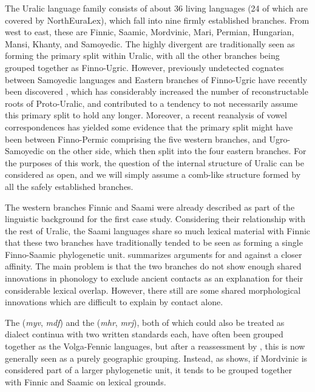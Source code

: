 The Uralic language family consists of about 36 living languages (24 of which are covered by NorthEuraLex), which fall into nine firmly established branches. From west to east, these are Finnic, Saamic, Mordvinic, Mari, Permian, Hungarian, Mansi, Khanty, and Samoyedic. The highly divergent  are traditionally seen as forming the primary split within Uralic, with all the other branches being grouped together as Finno-Ugric. However, previously undetected cognates between Samoyedic languages and Eastern branches of Finno-Ugric have recently been discovered \citep{aikio2002,aikio2006etym}, which has considerably increased the number of reconstructable roots of Proto-Uralic, and contributed to a tendency to not necessarily assume this primary split to hold any longer. Moreover, a recent reanalysis of vowel correspondences \citep{hakkinen2007} has yielded some evidence that the primary split might have been between Finno-Permic comprising the five western branches, and Ugro-Samoyedic on the other side, which then split into the four eastern branches. For the purposes of this work, the question of the internal structure of Uralic can be considered as open, and we will simply assume a comb-like structure formed by all the safely established branches.

The western branches Finnic and Saami were already described as part of the linguistic background for the first case study. Considering their relationship with the rest of Uralic, the Saami languages share so much lexical material with Finnic that these two branches have traditionally tended to be seen as forming a single Finno-Saamic phylogenetic unit. \cite{aikio2012} summarizes arguments for and against a closer affinity. The main problem is that the two branches do not show enough shared innovations in phonology to exclude ancient contacts as an explanation for their considerable lexical overlap. However, there still are some shared morphological innovations which are difficult to explain by contact alone.

The  (\textit{myv}, \textit{mdf}) and the  (\textit{mhr}, \textit{mrj}), both of which could also be treated as dialect continua with two written standards each, have often been grouped together as the Volga-Fennic languages, but after a reassessment by \cite{bereczki1988}, this is now generally seen as a purely geographic grouping. Instead, as \cite{gruenthal2007} shows, if Mordvinic is considered part of a larger phylogenetic unit, it tends to be grouped together with Finnic and Saamic on lexical grounds.


